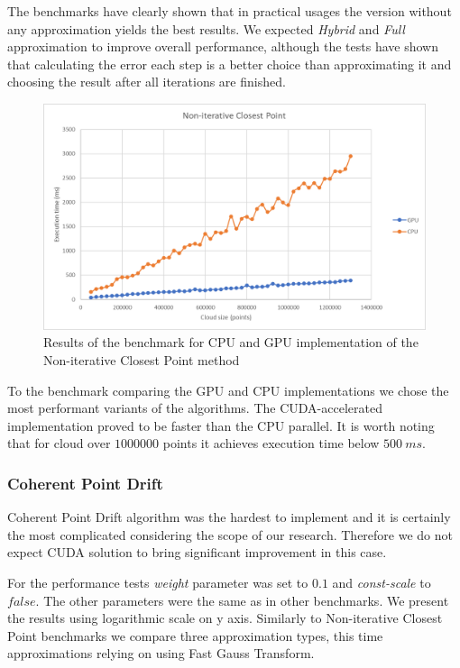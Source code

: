 \documentclass[titlepage]{article}
\begin{document}
The benchmarks have clearly shown that in practical usages the version without any approximation yields the best results. We expected \textit{Hybrid} and \textit{Full} approximation to improve overall performance, although the tests have shown that calculating the error each step is a better choice than approximating it and choosing the result after all iterations are finished.

\begin{figure}[H]
\includegraphics[width=\textwidth]{ms-nicp-4.png}
\caption{Results of the benchmark for CPU and GPU implementation of the Non-iterative Closest Point method}
\end{figure}

To the benchmark comparing the GPU and CPU implementations we chose the most performant variants of the algorithms. The CUDA-accelerated implementation proved to be faster than the CPU parallel. It is worth noting that for cloud over $1000000$ points it achieves execution time below $500\: ms$. 

\subsubsection{Coherent Point Drift}
Coherent Point Drift algorithm was the hardest to implement and it is certainly the most complicated considering the scope of our research. Therefore we do not expect CUDA solution to bring significant improvement in this case.

For the performance tests \textit{weight} parameter was set to $0.1$ and \textit{const-scale} to $false$. The other parameters were the same as in other benchmarks. We present the results using logarithmic scale on y axis. Similarly to Non-iterative Closest Point benchmarks we compare three approximation types, this time approximations relying on using Fast Gauss Transform.
\end{document}
